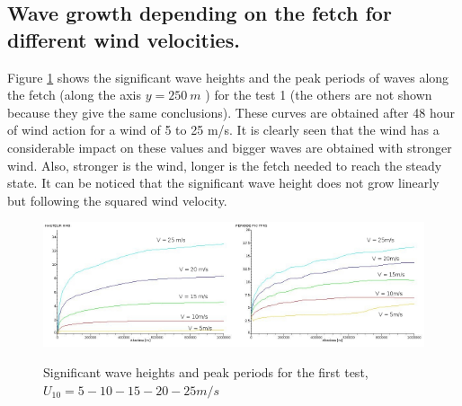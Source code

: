 \subsection{Wave growth depending on the fetch for different wind velocities.}
Figure \ref{hsfet} shows the significant wave heights and the peak periods of waves along the fetch (along the axis $ y = 250~m$ ) for the test 1 (the others are not shown because they give the same conclusions). These curves are obtained after 48 hour of wind action for a wind of 5 to 25 m/s. It is clearly seen that the wind has a considerable impact on these values and bigger waves are obtained with stronger wind. Also, stronger is the wind, longer is the fetch needed to reach the steady state. It can be noticed that the significant wave height does not grow linearly but following the squared wind velocity.
\begin{figure}[H]
  \centering
  	\includegraphics[width=0.5\textwidth]{Hm0_free_mesh.jpg}\includegraphics[width=0.5\textwidth]{Tp_free_mesh.jpg}
      \caption{Significant wave heights and peak periods for the first test, $U_{10} = 5 - 10 - 15 - 20 - 25 m/s$}
\label{hsfet}
\end{figure}
